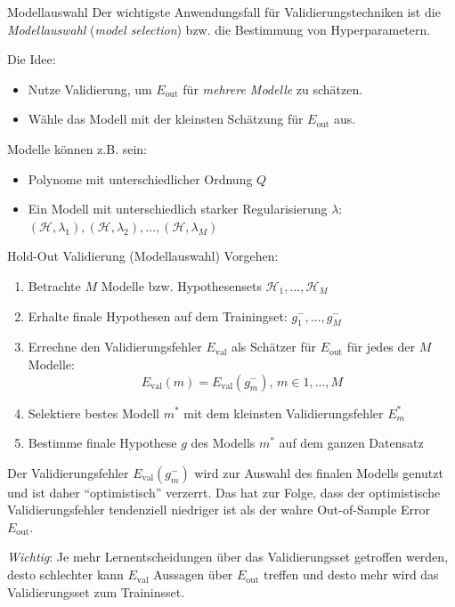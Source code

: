 \begin{defi}{Modellauswahl}
    Der wichtigste Anwendungsfall für Validierungstechniken ist die \emph{Modellauswahl} (\emph{model selection}) bzw. die Bestimmung von Hyperparametern.

    Die Idee:
    \begin{itemize}
        \item Nutze Validierung, um $E_\text{out}$ für \emph{mehrere Modelle} zu schätzen.
        \item Wähle das Modell mit der kleinsten Schätzung für $E_\text{out}$ aus.
    \end{itemize}

    Modelle können z.B. sein:
    \begin{itemize}
        \item Polynome mit unterschiedlicher Ordnung $Q$
        \item Ein Modell mit unterschiedlich starker Regularisierung $\lambda$: $(\mathcal{H}, \lambda_1), (\mathcal{H}, \lambda_2), \ldots, (\mathcal{H}, \lambda_M)$
    \end{itemize}
\end{defi}

\begin{defi}{Hold-Out Validierung (Modellauswahl)}
    Vorgehen:
    \begin{enumerate}
        \item Betrachte $M$ Modelle bzw. Hypothesensets $\mathcal{H}_1, \ldots, \mathcal{H}_M$
        \item Erhalte finale Hypothesen auf dem Trainingset: $g^{-}_1, \ldots, g^{-}_M$
        \item Errechne den Validierungsfehler $E_\text{val}$ als Schätzer für $E_\text{out}$ für jedes der $M$ Modelle:
              \[
                  E_\text{val}(m) = E_\text{val}(g^{-}_m), \, m \in 1, \ldots, M
              \]
        \item Selektiere bestes Modell $m^*$ mit dem kleinsten Validierungsfehler $E_m^*$
        \item Bestimme finale Hypothese $g$ des Modells $m^*$ auf dem ganzen Datensatz
    \end{enumerate}

    Der Validierungsfehler $E_\text{val}(g^{-}_m)$ wird zur Auswahl des finalen Modells genutzt und ist daher \enquote{optimistisch} verzerrt.
    Das hat zur Folge, dass der optimistische Validierungsfehler tendenziell niedriger ist als der wahre Out-of-Sample Error $E_\text{out}$.

    \emph{Wichtig}:
    Je mehr Lernentscheidungen über das Validierungsset getroffen werden, desto schlechter kann $E_\text{val}$ Aussagen über $E_\text{out}$ treffen und desto mehr wird das Validierungsset zum Traininsset.
\end{defi}

